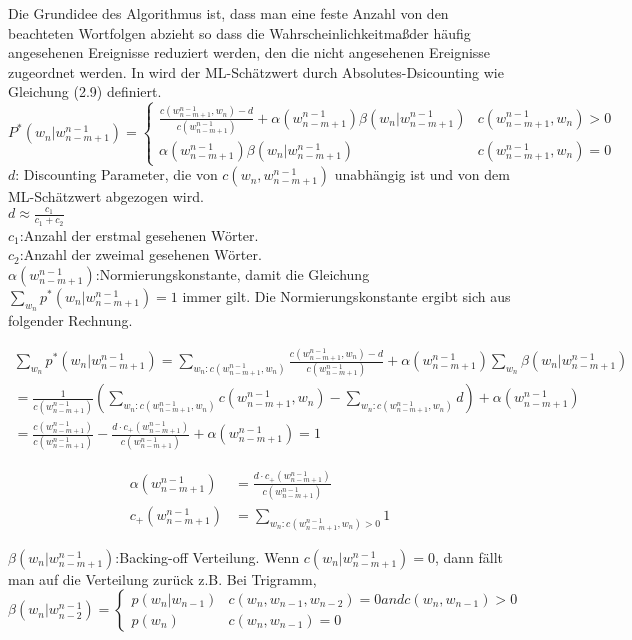 Die Grundidee des Algorithmus ist, dass man eine feste Anzahl von den beachteten Wortfolgen abzieht so dass die Wahrscheinlichkeitma\ss der h\"aufig angesehenen Ereignisse reduziert werden, den die nicht angesehenen Ereignisse zugeordnet werden. In \cite{ars_script} wird der ML-Sch\"atzwert durch Absolutes-Dsicounting wie Gleichung (2.9) definiert.
\begin{equation}
P^{*}(w_{n}|w_{n-m+1}^{n-1})=\begin{cases}
\frac{c(w_{n-m+1}^{n-1},w_{n})-d}{c(w_{n-m+1}^{n-1})}+\alpha (w_{n-m+1}^{n-1})\beta (w_{n}|w_{n-m+1}^{n-1}) & c(w_{n-m+1}^{n-1},w_{n})>0 \\
\alpha (w_{n-m+1}^{n-1})\beta (w_{n}|w_{n-m+1}^{n-1}) & c(w_{n-m+1}^{n-1},w_{n})=0 
\end{cases}
\end{equation}
$d$: Discounting Parameter, die von $c(w_{n},w_{n-m+1}^{n-1})$ unabh\"angig ist und von dem ML-Sch\"atzwert abgezogen wird.\\
$d\approx \frac{c_{1}}{c_{1}+c_{2}}$ \\
$c_{1}$:Anzahl der erstmal gesehenen W\"orter.\\
$c_{2}$:Anzahl der zweimal gesehenen W\"orter.\\
$\alpha (w_{n-m+1}^{n-1})$:Normierungskonstante, damit die Gleichung $\sum_{w_{n}}p^{*}(w_{n}|w_{n-m+1}^{n-1})=1$ immer gilt. Die Normierungskonstante ergibt sich aus folgender Rechnung.

\begin{multline}
\sum_{w_{n}}p^{*}(w_{n}|w_{n-m+1}^{n-1})=\sum_{w_{n}:c(w_{n-m+1}^{n-1},w_{n})}\frac{c(w_{n-m+1}^{n-1},w_{n})-d}{c(w_{n-m+1}^{n-1})}+\alpha(w_{n-m+1}^{n-1})\sum_{w_{n}}\beta (w_{n}|w_{n-m+1}^{n-1})\\
=\frac{1}{c(w_{n-m+1}^{n-1})}(\sum_{w_{n}:c(w_{n-m+1}^{n-1},w_{n})}c(w_{n-m+1}^{n-1},w_{n})-\sum_{w_{n}:c(w_{n-m+1}^{n-1},w_{n})}d)+\alpha (w_{n-m+1}^{n-1})\\
=\frac{c(w_{n-m+1}^{n-1})}{c(w_{n-m+1}^{n-1})}-\frac{d\cdot c_{+}(w_{n-m+1}^{n-1})}{c(w_{n-m+1}^{n-1})}+\alpha (w_{n-m+1}^{n-1})=1
\end{multline}

\begin{align}
\alpha (w_{n-m+1}^{n-1}) &=\frac{d\cdot c_{+}(w_{n-m+1}^{n-1})}{c(w_{n-m+1}^{n-1})}\\
c_{+}(w_{n-m+1}^{n-1}) &=\sum_{w_{n}:c(w_{n-m+1}^{n-1},w_{n})>0}1
\end{align}


$\beta (w_{n}|w_{n-m+1}^{n-1})$:Backing-off Verteilung. Wenn $c(w_{n}|w_{n-m+1}^{n-1})=0$, dann f\"allt man auf die Verteilung zur\"uck
z.B. Bei Trigramm,\\

\begin{equation}
\beta (w_{n}|w_{n-2}^{n-1})=\begin{cases}
p(w_{n}|w_{n-1}) & c(w_{n},w_{n-1},w_{n-2})=0 and c(w_{n},w_{n-1})>0 \\
p(w_{n}) & c(w_{n},w_{n-1})=0 
\end{cases}
\end{equation}

